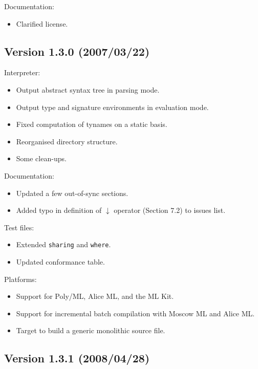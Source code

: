 \documentclass[twoside,titlepage]{article}
\begin{document}
\begin{appendix}
Documentation:
\begin{itemize}[nolistsep]
\item Clarified license.
\end{itemize}

\subsection*{Version 1.3.0 (2007/03/22)}

Interpreter:
\begin{itemize}[nolistsep]
\item Output abstract syntax tree in parsing mode.
\item Output type and signature environments in evaluation mode.
\item Fixed computation of tynames on a static basis.
\item Reorganised directory structure.
\item Some clean-ups.
\end{itemize}

Documentation:
\begin{itemize}[nolistsep]
\item Updated a few out-of-sync sections.
\item Added typo in definition of $\downarrow$ operator (Section 7.2) to issues list.
\end{itemize}

Test files:
\begin{itemize}[nolistsep]
\item Extended {\tt sharing} and {\tt where}.
\item Updated conformance table.
\end{itemize}

Platforms:
\begin{itemize}[nolistsep]
\item Support for Poly/ML, Alice ML, and the ML Kit.
\item Support for incremental batch compilation with Moscow ML and Alice ML.
\item Target to build a generic monolithic source file.
\end{itemize}

\subsection*{Version 1.3.1 (2008/04/28)}


\end{appendix}
\end{document}
